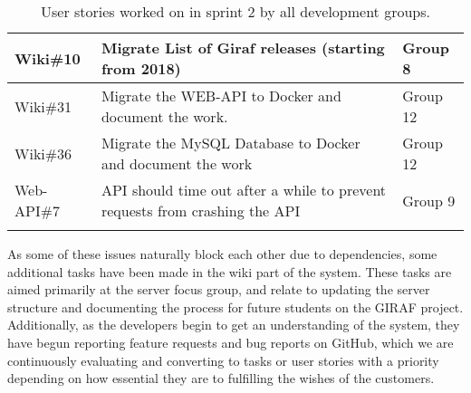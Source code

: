 \begin{longtable}{|p{2.8cm}|p{7cm}|p{2cm}|}
    Wiki\#10        & Migrate List of Giraf releases (starting from 2018)                                                                                                                                      & Group 8             \\ \hline
    Wiki\#31        & Migrate the WEB-API to Docker and document the work.                                                                                                                                     & Group 12            \\ \hline
    Wiki\#36        & Migrate the MySQL Database to Docker and document the work                                                                                                                               & Group 12            \\ \hline
    Web-API\#7      & API should time out after a while to prevent requests from crashing the API                                                                                                              & Group 9             \\ \hline
    \caption{User stories worked on in sprint 2 by all development groups.}\label{table:user-stories-sprint-2}
\end{longtable}


\noindent 
As some of these issues naturally block each other due to dependencies, some additional tasks have been made in the wiki part of the system. 
These tasks are aimed primarily at the server focus group, and relate to updating the server structure and documenting the process for future students on the GIRAF project.
Additionally, as the developers begin to get an understanding of the system, they have begun reporting feature requests and bug reports on GitHub, which we are continuously evaluating and converting to tasks or user stories with a priority depending on how essential they are to fulfilling the wishes of the customers.
